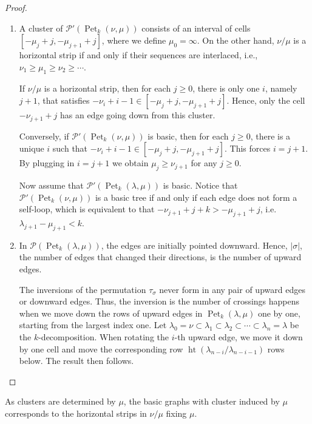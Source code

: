 \documentclass[pdflatex,sn-mathphys-num]{sn-jnl}%
\theoremstyle{thmstyleone}%
\theoremstyle{thmstyletwo}%
\theoremstyle{thmstylethree}%
\numberwithin{equation}{section}
\DeclareMathOperator{\Pet}{Pet}
\DeclareMathOperator{\htt}{ht}
\begin{document}
    \begin{proof}\ \\
    \begin{enumerate}
        \item 
        A cluster of $\mathcal{P}'(\Pet_k(\nu,\mu))$ consists of an interval of cells $[-\mu_j+j,-\mu_{j+1}+j]$, where we define $\mu_0=\infty$. On the other hand, $\nu/\mu$ is a horizontal strip if and only if their sequences are interlaced, i.e., $\nu_1\ge \mu_1\ge \nu_2\ge \cdots$. 

        If $\nu/\mu$ is a horizontal strip, then for each $j\geq 0$, there is only one $i$, namely $j+1$, that satisfies $-\nu_i+i-1 \in [-\mu_j+j,-\mu_{j+1}+j]$. Hence, only the cell $-\nu_{j+1}+j$ has an edge going down from this cluster.

        Conversely, if $\mathcal{P}'(\Pet_k(\nu,\mu))$ is basic, then for each $j\geq 0$, there is a unique $i$ such that $-\nu_i+i-1 \in [-\mu_j+j,-\mu_{j+1}+j]$. This forces $i=j+1$. By plugging in $i=j+1$ we obtain $\mu_j\geq \nu_{j+1}$ for any $j\geq 0$.

        Now assume that $\mathcal{P}'(\Pet_k(\lambda,\mu))$ is basic. Notice that $\mathcal{P}'(\Pet_k(\nu,\mu))$ is a basic tree if and only if each edge does not form a self-loop, which is equivalent to that $-\nu_{j+1}+j+k > -\mu_{j+1}+j$, i.e. $\lambda_{j+1}-\mu_{j+1}<k$.
        \item In $\mathcal{P}(\Pet_k(\lambda,\mu))$, the edges are initially pointed downward. Hence, $|\sigma|$, the number of edges that changed their directions, is the number of upward edges.

        The inversions of the permutation $\tau_\sigma$ never form in any pair of upward edges or downward edges. Thus, the inversion is the number of crossings happens when we move down the rows of upward edges in $\Pet_k(\lambda,\mu)$ one by one, starting from the largest index one. Let $\lambda_0=\nu\subset \lambda_1\subset\lambda_2\subset\cdots\subset \lambda_n=\lambda$ be the $k$-decomposition. When rotating the $i$-th upward edge, we move it down by one cell and move the corresponding row $\htt(\lambda_{n-i}/\lambda_{n-i-1})$ rows below. The result then follows.
    \end{enumerate}
    \end{proof}        
    As clusters are determined by $\mu$, the basic graphs with cluster induced by $\mu$ corresponds to the horizontal strips in $\nu/\mu$ fixing $\mu$. 
\end{document}
